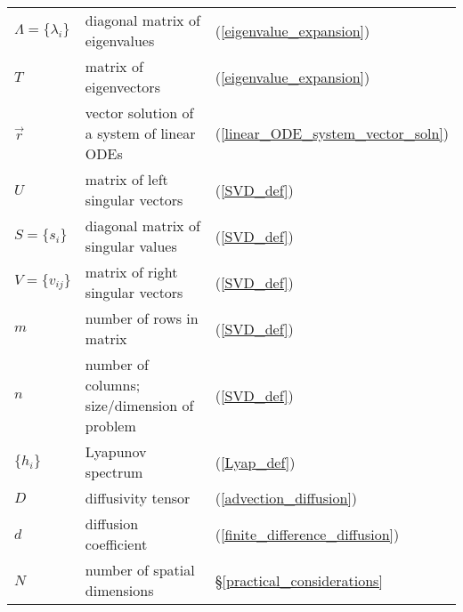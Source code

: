 \begin{tabular}{lll}
	$\Lambda = \lbrace \lambda_i \rbrace$ & diagonal matrix of eigenvalues & (\ref{eigenvalue_expansion}) \\
	$T$ & matrix of eigenvectors & (\ref{eigenvalue_expansion}) \\
	$\vec r$ & vector solution of a system of linear ODEs & (\ref{linear_ODE_system_vector_soln}) \\
	$U$ & matrix of left singular vectors & (\ref{SVD_def}) \\
	$S=\lbrace s_i \rbrace$ & diagonal matrix of singular values & (\ref{SVD_def}) \\
	$V=\lbrace v_{ij} \rbrace$ & matrix of right singular vectors & (\ref{SVD_def}) \\
	$m$ & number of rows in matrix & (\ref{SVD_def}) \\
	$n$ & number of columns; size/dimension of problem & (\ref{SVD_def}) \\
	$\lbrace h_i \rbrace$ & Lyapunov spectrum & (\ref{Lyap_def}) \\
	$D$ & diffusivity tensor & (\ref{advection_diffusion}) \\
	$d$ & diffusion coefficient & (\ref{finite_difference_diffusion}) \\
	$N$ & number of spatial dimensions & \S \ref{practical_considerations}
\end{tabular}

